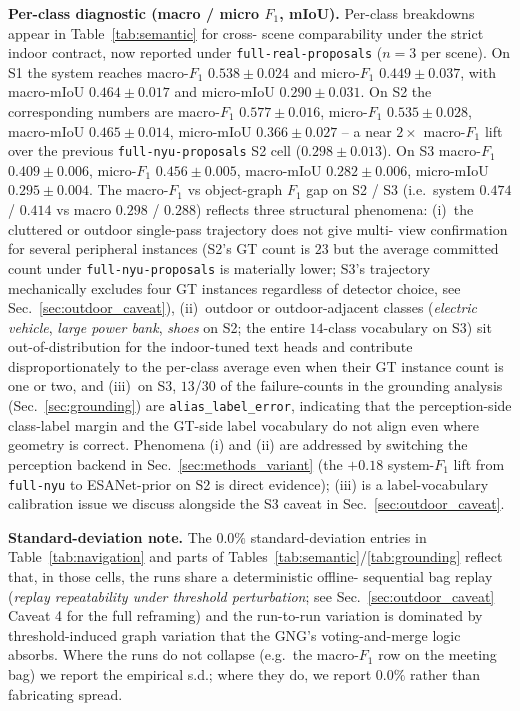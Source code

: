 \noindent\textbf{Per-class diagnostic (macro / micro $F_1$, mIoU).}
Per-class breakdowns appear in Table~\ref{tab:semantic} for cross-
scene comparability under the strict indoor contract, now reported
under \texttt{full-real-proposals} ($n{=}3$ per scene). On S1 the
system reaches macro-$F_1$ $0.538 \pm 0.024$ and micro-$F_1$
$0.449 \pm 0.037$, with macro-mIoU $0.464 \pm 0.017$ and micro-mIoU
$0.290 \pm 0.031$. On S2 the corresponding numbers are macro-$F_1$
$0.577 \pm 0.016$, micro-$F_1$ $0.535 \pm 0.028$, macro-mIoU
$0.465 \pm 0.014$, micro-mIoU $0.366 \pm 0.027$ -- a near
$2{\times}$ macro-$F_1$ lift over the previous \texttt{full-nyu-proposals}
S2 cell ($0.298 \pm 0.013$). On S3 macro-$F_1$ $0.409 \pm 0.006$,
micro-$F_1$ $0.456 \pm 0.005$, macro-mIoU $0.282 \pm 0.006$,
micro-mIoU $0.295 \pm 0.004$. The macro-$F_1$ vs object-graph $F_1$
gap on S2 / S3 (i.e.\ system $0.474$ / $0.414$ vs macro
$0.298$ / $0.288$) reflects three structural phenomena: (i)~the
cluttered or outdoor single-pass trajectory does not give multi-
view confirmation for several peripheral instances (S2's GT count
is $23$ but the average committed count under
\texttt{full-nyu-proposals} is materially lower; S3's trajectory
mechanically excludes four GT instances regardless of detector
choice, see Sec.~\ref{sec:outdoor_caveat}), (ii)~outdoor or
outdoor-adjacent classes (\emph{electric vehicle}, \emph{large
power bank}, \emph{shoes} on S2; the entire $14$-class vocabulary
on S3) sit out-of-distribution for the indoor-tuned text heads
and contribute disproportionately to the per-class average even
when their GT instance count is one or two, and (iii)~on S3,
$13$/$30$ of the failure-counts in the grounding analysis
(Sec.~\ref{sec:grounding}) are \texttt{alias\_label\_error},
indicating that the perception-side class-label margin and the
GT-side label vocabulary do not align even where geometry is
correct. Phenomena (i) and (ii) are addressed by switching the
perception backend in Sec.~\ref{sec:methods_variant} (the
$+0.18$ system-$F_1$ lift from \texttt{full-nyu} to ESANet-prior
on S2 is direct evidence); (iii) is a label-vocabulary
calibration issue we discuss alongside the S3 caveat in
Sec.~\ref{sec:outdoor_caveat}.

\noindent\textbf{Standard-deviation note.}
The $0.0\%$ standard-deviation entries in Table~\ref{tab:navigation}
and parts of Tables~\ref{tab:semantic}/\ref{tab:grounding} reflect
that, in those cells, the runs share a deterministic offline-
sequential bag replay (\emph{replay repeatability under threshold
perturbation}; see Sec.~\ref{sec:outdoor_caveat} Caveat 4 for the
full reframing) and the run-to-run variation is dominated by
threshold-induced graph variation that the GNG's voting-and-merge
logic absorbs. Where the runs do not collapse (e.g.\ the
macro-$F_1$ row on the meeting bag) we report the empirical s.d.;
where they do, we report $0.0\%$ rather than fabricating spread.


